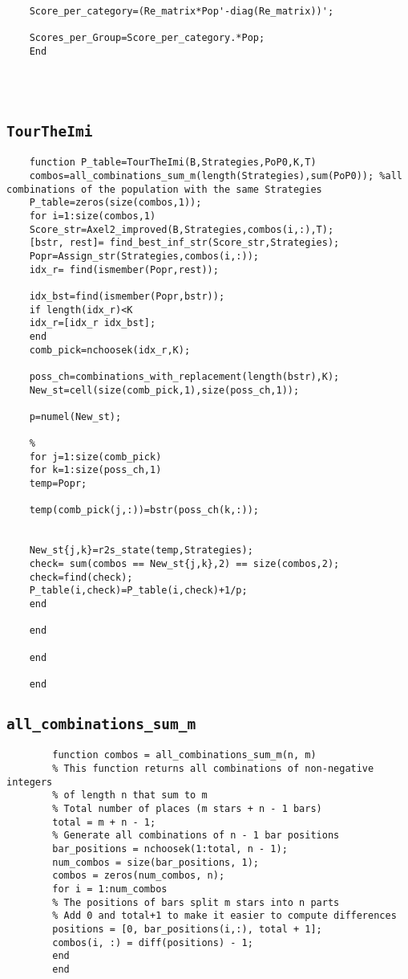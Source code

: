 \begin{appendices}
\begin{lstlisting}
	Score_per_category=(Re_matrix*Pop'-diag(Re_matrix))';
	
	Scores_per_Group=Score_per_category.*Pop;
	End
	
	
	
\end{lstlisting}

\subsection*{\texttt{TourTheImi}}
\label{appendix:TTI}
	\begin{lstlisting}
	function P_table=TourTheImi(B,Strategies,PoP0,K,T)
	combos=all_combinations_sum_m(length(Strategies),sum(PoP0)); %all combinations of the population with the same Strategies
	P_table=zeros(size(combos,1));
	for i=1:size(combos,1)
	Score_str=Axel2_improved(B,Strategies,combos(i,:),T);
	[bstr, rest]= find_best_inf_str(Score_str,Strategies);
	Popr=Assign_str(Strategies,combos(i,:));
	idx_r= find(ismember(Popr,rest));
	
	idx_bst=find(ismember(Popr,bstr));
	if length(idx_r)<K
	idx_r=[idx_r idx_bst];
	end
	comb_pick=nchoosek(idx_r,K);
	
	poss_ch=combinations_with_replacement(length(bstr),K);
	New_st=cell(size(comb_pick,1),size(poss_ch,1));
	
	p=numel(New_st);
	
	%
	for j=1:size(comb_pick)
	for k=1:size(poss_ch,1)
	temp=Popr;
	
	temp(comb_pick(j,:))=bstr(poss_ch(k,:));
	
	
	New_st{j,k}=r2s_state(temp,Strategies);
	check= sum(combos == New_st{j,k},2) == size(combos,2);
	check=find(check);
	P_table(i,check)=P_table(i,check)+1/p;
	end
	
	end
	
	end
	
	end \end{lstlisting}
	
	
	\subsection*{\texttt{all\_combinations\_sum\_m}}
	\label{appendix:ACS}
		\begin{lstlisting}
		function combos = all_combinations_sum_m(n, m)
		% This function returns all combinations of non-negative integers
		% of length n that sum to m
		% Total number of places (m stars + n - 1 bars)
		total = m + n - 1;
		% Generate all combinations of n - 1 bar positions
		bar_positions = nchoosek(1:total, n - 1);
		num_combos = size(bar_positions, 1);
		combos = zeros(num_combos, n);
		for i = 1:num_combos
		% The positions of bars split m stars into n parts
		% Add 0 and total+1 to make it easier to compute differences
		positions = [0, bar_positions(i,:), total + 1];
		combos(i, :) = diff(positions) - 1;
		end
		end
		

\end{lstlisting}
\end{appendices}
